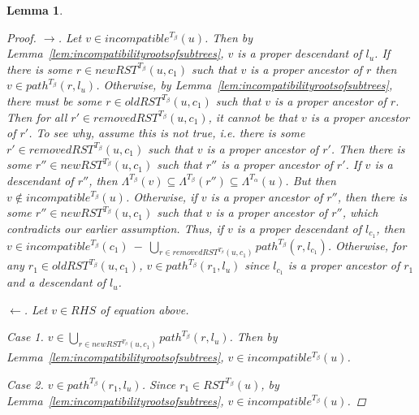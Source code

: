 \documentclass{article}
\newcommand{\leafset}{\Lambda}
\newcommand{\TA}{T_\alpha}
\newcommand{\TB}{T_\beta}
\newtheorem{incompatibilityrecursive}[incompatibility]{Lemma}
\begin{document}
\begin{incompatibilityrecursive}
\begin{proof}
            $\longrightarrow$. Let $v \in incompatible^{\TB}(u)$. Then by Lemma~\ref{lem:incompatibilityrootsofsubtrees}, $v$ is a proper descendant of $l_u$. If there is some $r \in newRST^{\TB}(u, c_1)$ such that $v$ is a proper ancestor of $r$ then $v \in path^{\TB}(r, l_u)$. Otherwise, by Lemma~\ref{lem:incompatibilityrootsofsubtrees}, there must be some $r \in oldRST^{\TB}(u, c_1)$ such that $v$ is a proper ancestor of $r$. Then for all $r' \in removedRST^{\TB}(u, c_1)$, it cannot be that $v$ is a proper ancestor of $r'$. To see why, assume this is not true, i.e. there is some $r' \in removedRST^{\TB}(u, c_1)$ such that $v$ is a proper ancestor of $r'$. Then there is some $r'' \in newRST^{\TB}(u, c_1)$ such that $r''$ is a proper ancestor of $r'$. If $v$ is a descendant of $r''$, then $\leafset^{\TB}(v) \subseteq \leafset^{\TB}(r'') \subseteq \leafset^{\TA}(u)$. But then $v \not\in incompatible^{\TB}(u)$. Otherwise, if $v$ is a proper ancestor of $r''$, then there is some $r'' \in newRST^{\TB}(u, c_1)$ such that $v$ is a proper ancestor of $r''$, which contradicts our earlier assumption. Thus, if $v$ is a proper descendant of $l_{c_1}$, then $v \in incompatible^{\TB}(c_1)\ -\ \bigcup_{r \in removedRST^{\TB}(u, c_1)} path^{\TB}(r, l_{c_1})$. Otherwise, for any $r_1 \in oldRST^{\TB}(u, c_1)$, $v \in path^{\TB}(r_1, l_u)$ since $l_{c_1}$ is a proper ancestor of $r_1$ and a descendant of $l_u$.

            $\longleftarrow$. Let $v \in RHS$ of equation above.

            \textit{Case 1.} $v \in \bigcup_{r \in newRST^{\TB}(u, c_1)} path^{\TB}(r, l_u)$. Then by Lemma~\ref{lem:incompatibilityrootsofsubtrees}, $v \in incompatible^{\TB}(u)$.

            \textit{Case 2.} $v \in path^{\TB}(r_1, l_u)$. Since $r_1 \in RST^{\TB}(u)$, by Lemma~\ref{lem:incompatibilityrootsofsubtrees}, $v \in incompatible^{\TB}(u)$.


\end{proof}
\end{incompatibilityrecursive}
\end{document}
